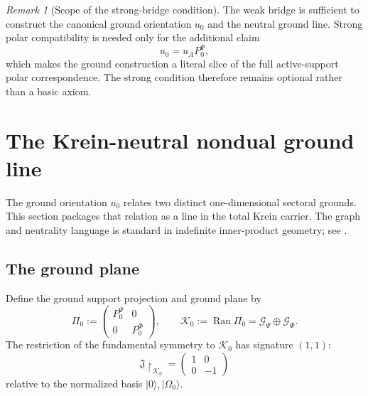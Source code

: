 \documentclass[11pt,reqno]{scrartcl}
\newcommand{\fundJ}{\mathfrak J}
\newcommand{\PzeroP}{P_{0}^{\Psi}}
\newcommand{\PzeroF}{P_{0}^{\Phi}}
\newcommand{\GzeroP}{\mathscr G_{\Psi}}
\newcommand{\GzeroF}{\mathscr G_{\Phi}}
\newcommand{\Kzero}{\mathscr K_{0}}
\newcommand{\Pizero}{\Pi_{0}}
\newcommand{\polA}{u_A}
\newcommand{\uzero}{u_{0}}
\newcommand{\ket}[1]{\lvert #1\rangle}
\DeclareMathOperator{\Ran}{Ran}
\newcommand{\restr}[2]{#1\!\upharpoonright_{#2}}
\theoremstyle{plain}
\theoremstyle{definition}
\theoremstyle{remark}
\newtheorem{remark}[remark]{Remark}
\begin{document}
\begin{remark}[Scope of the strong-bridge condition]
\label{rem:strong-ground-compatibility}
The weak bridge is sufficient to construct the canonical ground orientation
\(\uzero\) and the neutral ground line.  Strong polar compatibility is needed
only for the additional claim
\begin{equation}
  \uzero=\polA\PzeroP,
\end{equation}
which makes the ground construction a literal slice of the full active-support
polar correspondence.  The strong condition therefore remains optional rather
than a basic axiom.
\end{remark}
\section{The Krein-neutral nondual ground line}
\label{sec:neutral-ground-line}

The ground orientation \(\uzero\) relates two distinct one-dimensional
sectoral grounds.  This section packages that relation as a line in the total
Krein carrier.  The graph and neutrality language is standard in indefinite
inner-product geometry; see \cite{Bognar}.

\subsection{The ground plane}

Define the ground support projection and ground plane by
\begin{equation}
  \Pizero
  :=\begin{pmatrix}\PzeroP&0\\0&\PzeroF\end{pmatrix},
  \qquad
  \Kzero:=\Ran\Pizero=\GzeroP\oplus\GzeroF.
  \label{eq:ground-plane-definition}
\end{equation}
The restriction of the fundamental symmetry to \(\Kzero\) has signature
\((1,1)\):
\begin{equation}
  \restr{\fundJ}{\Kzero}
  =\begin{pmatrix}1&0\\0&-1\end{pmatrix}
  \label{eq:J-ground-plane}
\end{equation}
relative to the normalized basis \(\ket0,\ket{\Omega_0}\).
\end{document}
